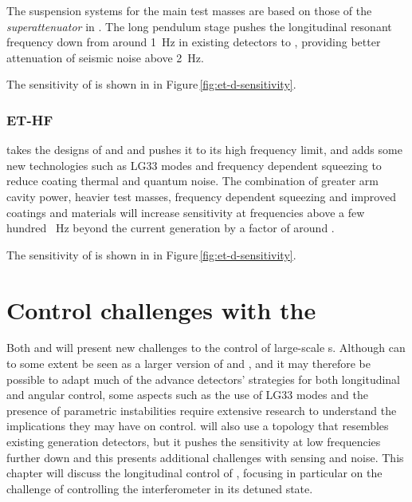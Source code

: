 The suspension systems for the main test masses are based on those of the \emph{superattenuator} in \VIRGO{} \cite{Acernese2010}. The  long pendulum stage  pushes the longitudinal resonant frequency down from around \SI{1}{\hertz} in existing detectors to , providing better attenuation of seismic noise above \SI{2}{\hertz}.

The sensitivity of \ETLF{} is shown in  in Figure\,\ref{fig:et-d-sensitivity}.

\subsubsection{ET-HF}
\ETHF{} takes the designs of \ALIGO{} and \AVIRGO{} and pushes it to its high frequency limit, and adds some new technologies such as LG33 modes \cite{Carbone2013} and frequency dependent squeezing to reduce coating thermal and quantum noise. The combination of greater arm cavity power, heavier test masses, frequency dependent squeezing and improved coatings and materials will increase sensitivity at frequencies above a few hundred \SI{}{\hertz} beyond the current generation by a factor of around .

The sensitivity of \ETHF{} is shown in  in Figure\,\ref{fig:et-d-sensitivity}.

\section{\label{sec:et-lf-control-challenges}Control challenges with the \ET{}}
Both \ETLF{} and \ETHF{} will present new challenges to the control of large-scale \DRFPMI{}s. Although \ETHF{} can to some extent be seen as a larger version of \ALIGO{} and \AVIRGO{}, and it may therefore be possible to adapt much of the advance detectors' strategies for both longitudinal and angular control, some aspects such as the use of LG33 modes and the presence of parametric instabilities \cite{Evans2015} require extensive research to understand the implications they may have on control. \ETLF{} will also use a topology that resembles existing generation detectors, but it pushes the sensitivity at low frequencies further down and this presents additional challenges with sensing and noise. This chapter will discuss the longitudinal control of \ETLF{}, focusing in particular on the challenge of controlling the interferometer in its detuned state.

